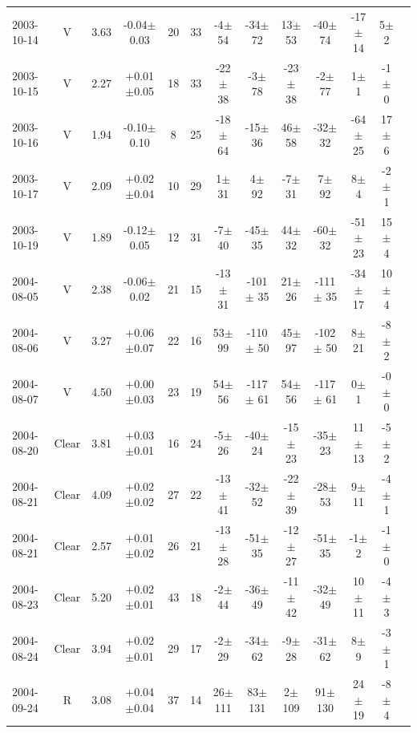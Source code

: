 \documentclass[12pt,a4paper]{report}
\begin{document}
\begin{landscape}
\begin{longtable}{|l|c|c|c|c|c|c|c|c|c|c|c|c|}
2003-10-14 & V     & 3.63 & -0.04$\pm$0.03 &  20 &  33 &   -4$\pm$ 54 &  -34$\pm$ 72 &   13$\pm$ 53 &  -40$\pm$ 74 &  -17$\pm$ 14 &    5$\pm$  2 \\ 
2003-10-15 & V     & 2.27 & +0.01$\pm$0.05 &  18 &  33 &  -22$\pm$ 38 &   -3$\pm$ 78 &  -23$\pm$ 38 &   -2$\pm$ 77 &    1$\pm$  1 &   -1$\pm$  0 \\ 
2003-10-16 & V     & 1.94 & -0.10$\pm$0.10 &   8 &  25 &  -18$\pm$ 64 &  -15$\pm$ 36 &   46$\pm$ 58 &  -32$\pm$ 32 &  -64$\pm$ 25 &   17$\pm$  6 \\ 
2003-10-17 & V     & 2.09 & +0.02$\pm$0.04 &  10 &  29 &    1$\pm$ 31 &    4$\pm$ 92 &   -7$\pm$ 31 &    7$\pm$ 92 &    8$\pm$  4 &   -2$\pm$  1 \\ 
2003-10-19 & V     & 1.89 & -0.12$\pm$0.05 &  12 &  31 &   -7$\pm$ 40 &  -45$\pm$ 35 &   44$\pm$ 32 &  -60$\pm$ 32 &  -51$\pm$ 23 &   15$\pm$  4 \\ 
2004-08-05 & V     & 2.38 & -0.06$\pm$0.02 &  21 &  15 &  -13$\pm$ 31 & -101$\pm$ 35 &   21$\pm$ 26 & -111$\pm$ 35 &  -34$\pm$ 17 &   10$\pm$  4 \\ 
2004-08-06 & V     & 3.27 & +0.06$\pm$0.07 &  22 &  16 &   53$\pm$ 99 & -110$\pm$ 50 &   45$\pm$ 97 & -102$\pm$ 50 &    8$\pm$ 21 &   -8$\pm$  2 \\ 
2004-08-07 & V     & 4.50 & +0.00$\pm$0.03 &  23 &  19 &   54$\pm$ 56 & -117$\pm$ 61 &   54$\pm$ 56 & -117$\pm$ 61 &    0$\pm$  1 &   -0$\pm$  0 \\ 
2004-08-20 & Clear & 3.81 & +0.03$\pm$0.01 &  16 &  24 &   -5$\pm$ 26 &  -40$\pm$ 24 &  -15$\pm$ 23 &  -35$\pm$ 23 &   11$\pm$ 13 &   -5$\pm$  2 \\ 
2004-08-21 & Clear & 4.09 & +0.02$\pm$0.02 &  27 &  22 &  -13$\pm$ 41 &  -32$\pm$ 52 &  -22$\pm$ 39 &  -28$\pm$ 53 &    9$\pm$ 11 &   -4$\pm$  1 \\ 
2004-08-21 & Clear & 2.57 & +0.01$\pm$0.02 &  26 &  21 &  -13$\pm$ 28 &  -51$\pm$ 35 &  -12$\pm$ 27 &  -51$\pm$ 35 &   -1$\pm$  2 &   -1$\pm$  0 \\ 
2004-08-23 & Clear & 5.20 & +0.02$\pm$0.01 &  43 &  18 &   -2$\pm$ 44 &  -36$\pm$ 49 &  -11$\pm$ 42 &  -32$\pm$ 49 &   10$\pm$ 11 &   -4$\pm$  3 \\ 
2004-08-24 & Clear & 3.94 & +0.02$\pm$0.01 &  29 &  17 &   -2$\pm$ 29 &  -34$\pm$ 62 &   -9$\pm$ 28 &  -31$\pm$ 62 &    8$\pm$  9 &   -3$\pm$  1 \\ 
2004-09-24 & R     & 3.08 & +0.04$\pm$0.04 &  37 &  14 &   26$\pm$111 &   83$\pm$131 &    2$\pm$109 &   91$\pm$130 &   24$\pm$ 19 &   -8$\pm$  4 \\ 

\end{longtable}
\end{landscape}
\end{document}
